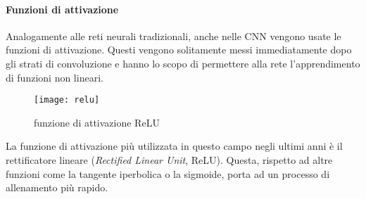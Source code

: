 \paragraph{Funzioni di attivazione}
Analogamente alle reti neurali tradizionali, anche nelle CNN vengono usate le funzioni di attivazione. Questi vengono solitamente messi immediatamente dopo gli strati di convoluzione e hanno lo scopo di permettere alla rete l'apprendimento di funzioni non lineari. 
\begin{figure}[ht]
    \centering
    \texttt{[image: relu]}
    \caption[Funzione di attivazione relu]{funzione di attivazione ReLU}
    \label{relu}
\end{figure}
La funzione di attivazione più utilizzata in questo campo negli ultimi anni è il rettificatore lineare (\textit{Rectified Linear Unit}, ReLU). Questa, rispetto ad altre funzioni come la tangente iperbolica o la sigmoide, porta ad un processo di allenamento più rapido.